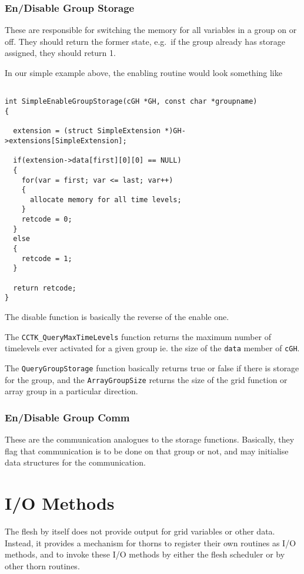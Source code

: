 \subsubsection{En/Disable Group Storage}

These are responsible for switching the memory for all variables
in a group on or off.  They should return the former state, e.g.\
if the group already has storage assigned, they should return 1.

In our simple example above, the enabling routine would look
something like

\begin{verbatim}

int SimpleEnableGroupStorage(cGH *GH, const char *groupname)
{

  extension = (struct SimpleExtension *)GH->extensions[SimpleExtension];

  if(extension->data[first][0][0] == NULL)
  {
    for(var = first; var <= last; var++)
    {
      allocate memory for all time levels;
    }
    retcode = 0;
  }
  else
  {
    retcode = 1;
  }

  return retcode;
}

\end{verbatim}

The disable function is basically the reverse of the enable one.

The {\tt CCTK\_QueryMaxTimeLevels} function returns the maximum number of
timelevels ever activated for a given group ie. the size of the {\tt data}
member of {\tt cGH}.

The {\tt QueryGroupStorage} function basically returns true or false if
there is storage for the group, and the {\tt ArrayGroupSize} returns the
size of the grid function or array group in a particular direction.

\subsubsection{En/Disable Group Comm}

These are the communication analogues to the storage functions.  Basically,
they flag that communication is to be done on that group or not, and may
initialise data structures for the communication.


\section{I/O Methods}
\label{chap:io_methods}
%
The flesh by itself does not provide output for grid variables or other data.
Instead, it provides a mechanism for thorns to register their own
routines as I/O methods, and to invoke these I/O methods by either the
flesh scheduler or by other thorn routines.

